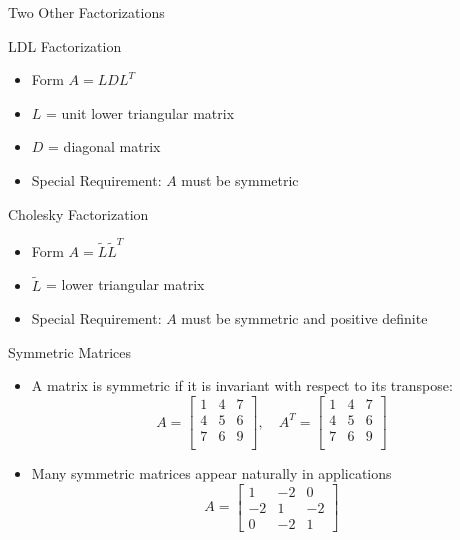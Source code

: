 \documentclass[10pt]{beamer}
\begin{document}
\begin{frame}{Two Other Factorizations}

\begin{block}{LDL Factorization}
\begin{itemize}
    \item Form $A = LDL^T$
    \item $L$ = unit lower triangular matrix 
    \item $D$ = diagonal matrix
    \item Special Requirement: $A$ must be symmetric
\end{itemize}
\end{block}

\begin{block}{Cholesky Factorization}
\begin{itemize}
    \item Form $A = \tilde{L}\tilde{L}^T$
    \item $\tilde{L}$ = lower triangular matrix 
    \item Special Requirement: $A$ must be symmetric and positive definite
\end{itemize}
\end{block}
    
    
\end{frame}

\begin{frame}{Symmetric Matrices}
\begin{itemize}
    \vspace{3mm}
    \item A matrix is symmetric if it is invariant with respect to its transpose: 
    $$
    A = 
    \begin{bmatrix}
    1 & 4 & 7\\
    4 & 5 & 6\\
    7 & 6 & 9\\
    \end{bmatrix}, \quad A^T = 
    \begin{bmatrix}
    1 & 4 & 7\\
    4 & 5 & 6\\
    7 & 6 & 9\\
    \end{bmatrix}
    $$
    \item Many symmetric matrices appear naturally in applications
    \[
A = \left[\begin{array}{rrr}
  1 & -2 &  0 \\
 -2 &  1 & -2 \\
  0 & -2 &  1
\end{array}\right]
\]
\end{itemize}

\end{frame}
\end{document}
